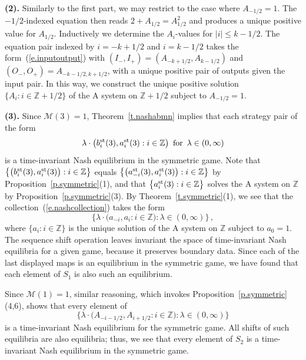 \documentclass[letterpaper,11pt,oneside,reqno]{amsbook}
\newcommand{\Z}{\ensuremath{\mathbb{Z}}}
\numberwithin{figure}{chapter}
\theoremstyle{definition}
\theoremstyle{definition}
\theoremstyle{definition}
\theoremstyle{definition}
\theoremstyle{definition}
\newcommand{\asta}{a^{\rm st}}
\newcommand{\bst}{b^{\rm st}}
\newcommand{\minamm}{\mathcal{M}}
\newcommand{\amacspace}{\textrm{A} }
\begin{document}
{\bf (2).} Similarly to the first part, we may restrict to the case where $A_{-1/2} = 1$. The $-1/2$-indexed equation then reads $2+ A_{1/2} = A_{1/2}^2$ and produces a unique positive value for $A_{1/2}$.
Inductively we determine the $A_i$-values for $\vert i \vert \leq k -1/2$. The equation pair indexed by $i = -k + 1/2$ and $i = k - 1/2$
takes the form~(\ref{e.inputoutput}) with $(I_-,I_+) = (A_{-k+1/2},A_{k - 1/2})$ and $(O_-,O_+) = A_{-k-1/2,k+1/2}$, with a unique positive pair of outputs given the input pair. In this way, we construct the unique positive solution $\big\{ A_i: i \in \Z + 1/2 \big\}$ of the \amacspace system on $\Z+1/2$ subject to $A_{-1/2} = 1$.

{\bf (3).}
Since $\minamm(3)=1$, Theorem~\ref{t.nashabmn} implies that each strategy pair of the form 
\begin{equation}\label{e.nashcollection}
\lambda \cdot \big( \bst_i(3), \asta_i(3): i \in \Z \big) \, \, \,  \textrm{for} \, \, \, \lambda \in (0,\infty) 
\end{equation}
is a time-invariant Nash equilibrium in the symmetric game.
Note that $\big\{ \big(\bst_i(3), \asta_i(3) \big): i \in \Z \big\}$ equals $\big\{ \big( \asta_{-i}(3), \asta_i(3) \big): i \in \Z \big\}$ by Proposition~\ref{p.symmetric}(1), and that $\big\{ \asta_i(3): i \in \Z \big\}$ solves the \amacspace system on $\Z$ by Proposition~\ref{p.symmetric}(3). By Theorem~\ref{t.symmetric}(1), we see that the collection~(\ref{e.nashcollection}) takes the form 
$$
\Big\{ \lambda \cdot \big( a_{-i}, a_i : i \in \Z \big) : \lambda \in (0,\infty) \Big\} \, ,
$$
where $\big\{ a_i: i \in \Z \big\}$ is the unique solution of the \amacspace system on $\Z$ subject to $a_0 = 1$. The sequence shift operation leaves invariant the space of time-invariant Nash equilibria for a given game, because it preserves boundary data. Since each of the last displayed maps is an equilibrium in the symmetric game, we have found that each element of $S_1$ is also such an equilibrium. 


Since $\minamm(1) =1$, similar reasoning, which invokes Proposition~\ref{p.symmetric}(4,6), shows that every element of
$$
\Big\{ \lambda \cdot \big( A_{-i-1/2}, A_{i+1/2}: i \in \Z \big) : \lambda \in (0,\infty) \Big\}
$$
is a time-invariant Nash equilibrium for the symmetric game. All shifts of such equilibria are also equilibria; thus, we see that every element of $S_2$ is a time-invariant Nash equilibrium in the symmetric game. 
\end{document}
